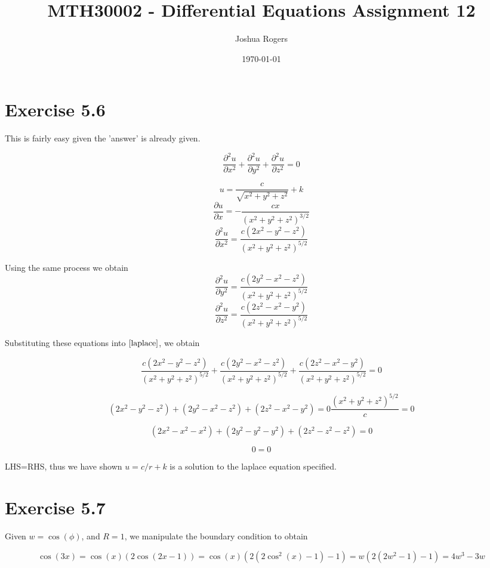 \documentclass{article}
\title{\vspace{-4cm}MTH30002 - Differential Equations Assignment 12}
\author{Joshua Rogers}
\date\today
\begin{document}
\maketitle

\section*{Exercise 5.6}

This is fairly easy given the 'answer' is already given.

\begin{equation}\label{laplace}
\frac{\partial^2 u}{\partial x^2} + \frac{\partial^2 u}{\partial y^2} +\frac{\partial^2 u}{\partial z^2} = 0
\end{equation}

$$u = \frac{c}{\sqrt{x^2+y^2+z^2}} + k$$
$$\frac{\partial u}{\partial x} = -\frac{cx}{\left(x^2+y^2+z^2\right)^{3/2}}$$
$$\frac{\partial^2 u}{\partial x^2} = \frac{c\left(2x^2-y^2-z^2\right)}{\left(x^2+y^2+z^2\right)^{5/2}}$$

Using the same process we obtain
$$\frac{\partial^2 u}{\partial y^2} = \frac{c\left(2y^2-x^2-z^2\right)}{\left(x^2+y^2+z^2\right)^{5/2}}$$
$$\frac{\partial^2 u}{\partial z^2} = \frac{c\left(2z^2-x^2-y^2\right)}{\left(x^2+y^2+z^2\right)^{5/2}}$$

Substituting these equations into $\eqref{laplace}$, we obtain

$$ \frac{c\left(2x^2-y^2-z^2\right)}{\left(x^2+y^2+z^2\right)^{5/2}} + \frac{c\left(2y^2-x^2-z^2\right)}{\left(x^2+y^2+z^2\right)^{5/2}} + \frac{c\left(2z^2-x^2-y^2\right)}{\left(x^2+y^2+z^2\right)^{5/2}} = 0$$

$$(2x^2-y^2-z^2) + (2y^2-x^2-z^2) + (2z^2-x^2-y^2) = 0 \frac{\left(x^2+y^2+z^2\right)^{5/2}}{c} = 0$$

$$(2x^2-x^2-x^2) + (2y^2-y^2-y^2) + (2z^2-z^2-z^2) = 0$$

$$0=0$$

LHS=RHS, thus we have shown $u=c/r+k$ is a solution to the laplace equation specified.

\section*{Exercise 5.7}

Given $w=\cos(\phi)$, and $R=1$, we manipulate the boundary condition to obtain

$$\cos(3x) = \cos(x)(2\cos(2x-1)) = \cos(x)(2(2\cos^2(x)-1)-1) = w(2(2w^2-1)-1) = 4w^3 -3w$$
\end{document}
